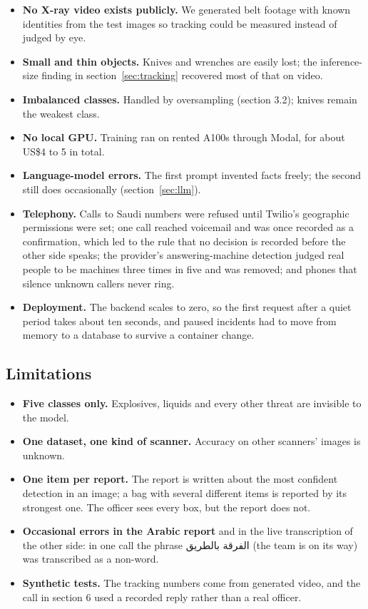 \documentclass[11pt,a4paper]{article}
\newcommand{\ar}[1]{\textarabic{#1}}
\begin{document}
\begin{itemize}
  \item \textbf{No X-ray video exists publicly.} We generated belt footage with known identities from
        the test images so tracking could be measured instead of judged by eye.
  \item \textbf{Small and thin objects.} Knives and wrenches are easily lost; the inference-size
        finding in section~\ref{sec:tracking} recovered most of that on video.
  \item \textbf{Imbalanced classes.} Handled by oversampling (section 3.2); knives remain the weakest
        class.
  \item \textbf{No local GPU.} Training ran on rented A100s through Modal, for about US\$4 to 5 in total.
  \item \textbf{Language-model errors.} The first prompt invented facts freely; the second still does
        occasionally (section~\ref{sec:llm}).
  \item \textbf{Telephony.} Calls to Saudi numbers were refused until Twilio's geographic permissions
        were set; one call reached voicemail and was once recorded as a confirmation, which led to the
        rule that no decision is recorded before the other side speaks; the provider's answering-machine
        detection judged real people to be machines three times in five and was removed; and phones
        that silence unknown callers never ring.
  \item \textbf{Deployment.} The backend scales to zero, so the first request after a quiet period
        takes about ten seconds, and paused incidents had to move from memory to a database to survive
        a container change.
\end{itemize}

\subsection{Limitations}

\begin{itemize}
  \item \textbf{Five classes only.} Explosives, liquids and every other threat are invisible to the
        model.
  \item \textbf{One dataset, one kind of scanner.} Accuracy on other scanners' images is unknown.
  \item \textbf{One item per report.} The report is written about the most confident detection in an
        image; a bag with several different items is reported by its strongest one. The officer
        sees every box, but the report does not.
  \item \textbf{Occasional errors in the Arabic report} and in the live transcription of the other side:
        in one call the phrase \ar{الفرقة بالطريق} (the team is on its way) was transcribed as a
        non-word.
  \item \textbf{Synthetic tests.} The tracking numbers come from generated video, and the call in
        section 6 used a recorded reply rather than a real officer.
\end{itemize}
\end{document}
